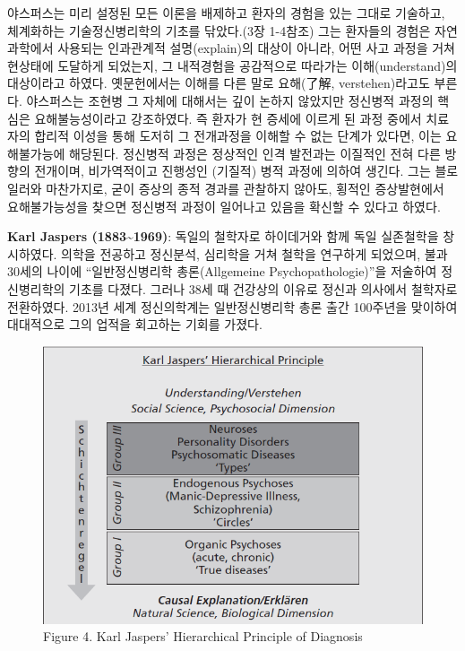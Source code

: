 \documentclass[
]{article}
\begin{document}
야스퍼스는 미리 설정된 모든 이론을 배제하고 환자의 경험을 있는 그대로
기술하고, 체계화하는 기술정신병리학의 기초를 닦았다.(3장 1-4참조) 그는
환자들의 경험은 자연과학에서 사용되는 인과관계적 설명(explain)의 대상이
아니라, 어떤 사고 과정을 거쳐 현상태에 도달하게 되었는지, 그 내적경험을
공감적으로 따라가는 이해(understand)의 대상이라고 하였다. 옛문헌에서는
이해를 다른 말로 요해(了解, verstehen)라고도 부른다. 야스퍼스는 조현병
그 자체에 대해서는 깊이 논하지 않았지만 정신병적 과정의 핵심은
요해불능성이라고 강조하였다. 즉 환자가 현 증세에 이르게 된 과정 중에서
치료자의 합리적 이성을 통해 도저히 그 전개과정을 이해할 수 없는 단계가
있다면, 이는 요해불가능에 해당된다. 정신병적 과정은 정상적인 인격
발전과는 이질적인 전혀 다른 방향의 전개이며, 비가역적이고 진행성인
(기질적) 병적 과정에 의하여 생긴다. 그는 블로일러와 마찬가지로, 굳이
증상의 종적 경과를 관찰하지 않아도, 횡적인 증상발현에서 요해불가능성을
찾으면 정신병적 과정이 일어나고 있음을 확신할 수 있다고 하였다.

\textbf{Karl Jaspers (1883\textasciitilde1969)}: 독일의 철학자로
하이데거와 함께 독일 실존철학을 창시하였다. 의학을 전공하고 정신분석,
심리학을 거쳐 철학을 연구하게 되었으며, 불과 30세의 나이에
``일반정신병리학 총론(Allgemeine Psychopathologie)''을 저술하여
정신병리학의 기초를 다졌다. 그러나 38세 때 건강상의 이유로 정신과
의사에서 철학자로 전환하였다. 2013년 세계 정신의학계는 일반정신병리학
총론 출간 100주년을 맞이하여 대대적으로 그의 업적을 회고하는 기회를
가졌다.

\begin{figure}
\hypertarget{hierarchy}{%
\centering
\includegraphics{images/01-01/img_2.png}
\caption{Figure 4. Karl Jaspers' Hierarchical Principle of
Diagnosis}\label{hierarchy}
}
\end{figure}
\end{document}
